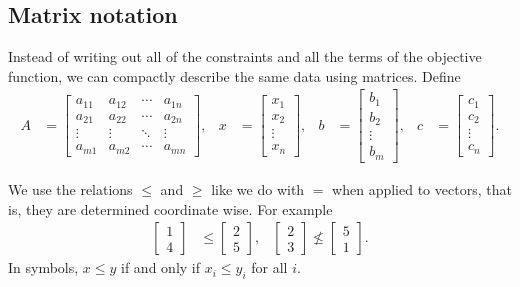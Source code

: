 \documentclass[a4paper, 12pt]{article}
\numberwithin{equation}{section}
\numberwithin{figure}{section}
\theoremstyle{definition}
\renewcommand{\leq}{\leqslant}
\renewcommand{\geq}{\geqslant}
\begin{document}
\subsection{Matrix notation}

Instead of writing out all of the constraints and all the terms of the objective
function, we can compactly describe the same data using matrices. Define 
\begin{align*}
	A &= \begin{bmatrix}
		a_{11} & a_{12} & \cdots & a_{1n} \\
		a_{21} & a_{22} & \cdots & a_{2n} \\
		\vdots & \vdots & \ddots & \vdots \\
		a_{m1} & a_{m2} & \cdots & a_{mn}
	\end{bmatrix}, & 
	x &= \begin{bmatrix}
		x_1 \\ x_2 \\ \vdots \\ x_n
	\end{bmatrix}, & 
	b &= \begin{bmatrix}
		b_1 \\ b_2 \\ \vdots \\ b_m 
	\end{bmatrix},  &
	c &= \begin{bmatrix}
		c_1 \\ c_2 \\ \vdots \\ c_n
	\end{bmatrix}. 
\end{align*}

We use the relations $\leq$ and $\geq$ like we do with $=$ when applied to vectors, that is, they are determined coordinate wise. For example 
\begin{align*}
	\begin{bmatrix}
		1 \\ 4
	\end{bmatrix} &\leq 
	\begin{bmatrix}
		2 \\ 5
	\end{bmatrix}, & 
	\begin{bmatrix}
		2 \\ 3 
	\end{bmatrix} \not\leq 
	\begin{bmatrix}
		5 \\ 1 
	\end{bmatrix}.
\end{align*}
In symbols, $x\leq y$ if and only if $x_i\leq y_i$ for all $i$.
\end{document}
